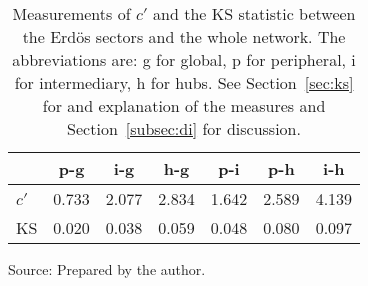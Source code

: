 \begin{table}[h!]
\begin{center}
\caption{Measurements of $c'$ and the KS statistic between the Erd\"os sectors and the whole network. The abbreviations are: g for global, p for peripheral, i for intermediary, h for hubs. See Section~\ref{sec:ks} for and explanation of the measures and Section~\ref{subsec:di} for discussion.}
\begin{tabular}{| l || c | c | c | c | c | c |}\hline
{\bf } & {\bf p-g} & {\bf i-g} & {\bf h-g} & {\bf p-i} & {\bf p-h} & {\bf i-h} \\\hline\hline
$c'$ & 0.733  & 2.077  & 2.834  & 1.642  & 2.589  & 4.139 \\
KS & 0.020  & 0.038  & 0.059  & 0.048  & 0.080  & 0.097 \\\hline
\end{tabular}
\begin{flushleft}
Source: Prepared by the author.\
\end{flushleft}
\end{center}
\end{table}
